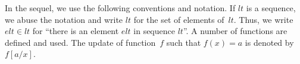 In the sequel, we use the following conventions and notation.
If $lt$ is a sequence, we abuse the notation and write $lt$ for the set of elements of~$lt$.
Thus, we write $elt\in lt$ for ``there is an element $elt$ in sequence $lt$''.
A number of functions are defined and used.
The update of function~$f$ such that $f(x) = a$ is denoted by $f[a/x]$.

\clearpage
